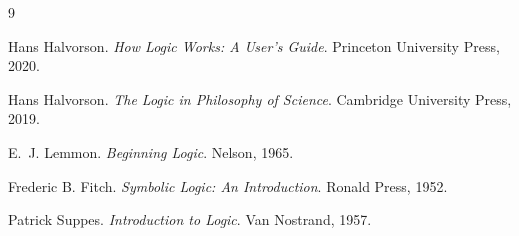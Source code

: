 \documentclass[11pt]{article}
\theoremstyle{plain}
\theoremstyle{definition}
\theoremstyle{remark}
\begin{document}
\begin{thebibliography}{9}

Hans Halvorson.
\emph{How Logic Works: A User's Guide}.
Princeton University Press, 2020.

Hans Halvorson.
\emph{The Logic in Philosophy of Science}.
Cambridge University Press, 2019.

E.~J. Lemmon.
\emph{Beginning Logic}.
Nelson, 1965.

Frederic B. Fitch.
\emph{Symbolic Logic: An Introduction}.
Ronald Press, 1952.

Patrick Suppes.
\emph{Introduction to Logic}.
Van Nostrand, 1957.

\end{thebibliography}
\end{document}
